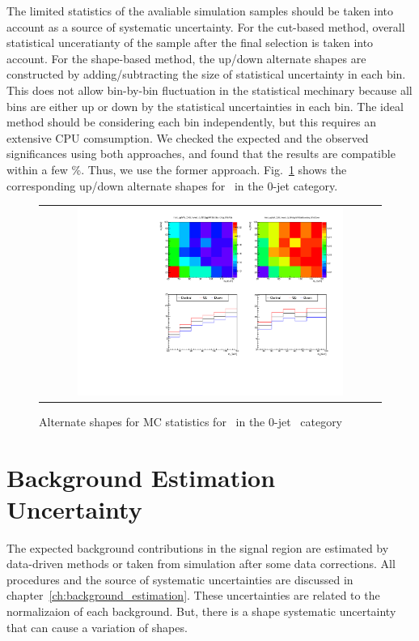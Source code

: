 The limited statistics of the avaliable simulation samples should be taken 
into account as a source of systematic uncertainty. 
For the cut-based method, overall statistical unceratianty of the sample 
after the final selection is taken into account. 
For the shape-based method, the up/down alternate shapes are constructed 
by adding/subtracting the size of statistical uncertainty in each bin. 
This does not allow bin-by-bin fluctuation in the statistical mechinary 
because all bins are either up or down by the statistical uncertainties 
in each bin. The ideal method should be considering each bin independently,
but this requires an extensive CPU comsumption. 
We checked the expected and the observed significances using both approaches,
and found that the results are compatible within a few \%. 
Thus, we use the former approach. 
Fig.~\ref{fig:alter_stat} shows the corresponding up/down alternate shapes
for \ggww\ in the 0-jet category. 
%
\begin{figure}[htp]
\centering
\begin{tabular}{c}
\includegraphics[width=0.8\textwidth]{figures/histo_ggWW_CMS_hww_of_0j_MVAggWWStatBounding_8TeV_0j_zoom.pdf}
\end{tabular}
\caption{Alternate shapes for MC statistics for \ggww\ in the 0-jet \DF\ category }
\label{fig:alter_stat}
\end{figure}



\section{Background Estimation Uncertainty} 

The expected background contributions in the signal region are estimated by 
data-driven methods or taken from simulation after some data corrections.  
All procedures and the source of systematic uncertainties are discussed 
in chapter~\ref{ch:background_estimation}. These uncertainties are related 
to the normalizaion of each background. But, there is a shape systematic uncertainty 
that can cause a variation of shapes. 

